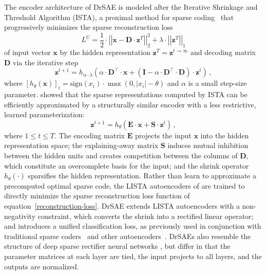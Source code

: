 \documentclass{article} %
\newcommand{\hid}{\mathbf{z}}
\newcommand{\inp}{\mathbf{x}}
\newcommand{\D}{\mathbf{D}}
\newcommand{\E}{\mathbf{E}}
\newcommand{\I}{\mathbf{I}}
\newcommand{\Sm}{\mathbf{S}}
\begin{document}
The encoder architecture of DrSAE is modeled after the Iterative Shrinkage and Threshold Algorithm (ISTA), a proximal method for sparse coding~\citep{chambolle1998, daubechies2004} that progressively minimizes the sparse reconstruction loss 
\begin{equation} \label{reconstruction-loss}
L^U = \frac{1}{2} \cdot \left| \left| \inp - \D \cdot \hid^T \right| \right|_2^2 + \lambda \cdot \left|\left|\hid^T \right|\right|_1
\end{equation} 
of input vector $\inp$ by the hidden representation $\hid^T = \hid^{t \rightarrow \infty}$ and decoding matrix $\D$ via the iterative step 
\begin{equation*}
\hid^{t+1} = h_{\alpha \cdot \lambda} \left(\alpha \cdot \D^{\top} \cdot \inp + \left(\I - \alpha \cdot \D^{\top} \cdot \D\right) \cdot \hid^t \right) \, ,
\end{equation*}  
where $\left[h_{\theta}(\mathbf{x}) \right]_i = \text{sign}\left(x_i \right) \cdot \max\left(0, \left|x_i \right| - \theta \right)$ and $\alpha$ is a small step-size parameter. %
\citet{gregor2010} showed that the sparse representations computed by ISTA can be efficiently approximated by a structurally similar encoder with a less restrictive, learned parameterization: 
\begin{equation*} 
\hid^{t+1} = h_{\theta} \left( \E \cdot \inp + \Sm \cdot \hid^t \right) \, ,
\end{equation*}
where $1 \leq t \leq T$.
The encoding matrix $\E$ projects the input $\inp$ into the hidden representation space; the explaining-away matrix $\Sm$ induces mutual inhibition between the hidden units and creates competition between the columns of $\D$, which constitute an overcomplete basis for the input; and the shrink operator $h_{\theta}(\cdot)$ sparsifies the hidden representation.  Rather than learn to approximate a precomputed optimal sparse code, the LISTA autoencoders of \citet{sprechmann2012a, sprechmann2012b} are trained to directly minimize the sparse reconstruction loss function of equation~\ref{reconstruction-loss}.  DrSAE extends LISTA autoencoders with a non-negativity constraint, which converts the shrink into a rectified linear operator; and introduces a unified classification loss, as previously used in conjunction with traditional sparse coders~\citep{bradley2008, mairal2009, mairal2012} and other autoencoders~\citep{ranzato2008, boureau2010}.
DrSAEs also resemble the structure of deep sparse rectifier neural networks \citep{glorot2011}, but differ in that the parameter matrices at each layer are tied, the input projects to all layers, and the outputs are normalized.  
\end{document}
